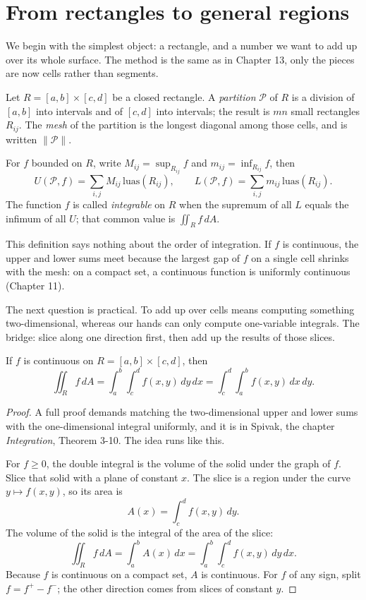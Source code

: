 \section{From rectangles to general regions}

We begin with the simplest object: a rectangle, and a
number we want to add up over its whole surface. The method is the same as in
Chapter 13, only the pieces are now cells rather than segments.

\begin{definisi}
Let $R=[a,b]\times[c,d]$ be a closed rectangle. A
\emph{partition} $\mathcal{P}$ of $R$ is a division of $[a,b]$ into
intervals and of $[c,d]$ into intervals; the result is $mn$ small
rectangles $R_{ij}$. The \emph{mesh} of the partition is the longest diagonal among
those cells, and is written $\|\mathcal{P}\|$.

For $f$ bounded on $R$, write $M_{ij}=\sup_{R_{ij}}f$ and
$m_{ij}=\inf_{R_{ij}}f$, then
\[
U(\mathcal{P},f)=\sum_{i,j}M_{ij}\,\mathrm{luas}(R_{ij}),
\qquad
L(\mathcal{P},f)=\sum_{i,j}m_{ij}\,\mathrm{luas}(R_{ij}).
\]
The function $f$ is called \emph{integrable} on $R$ when the supremum of all $L$ equals
the infimum of all $U$; that common value is $\iint_{R}f\,dA$.
\end{definisi}

This definition says nothing about the order of integration. If $f$ is continuous, the upper
and lower sums meet because the largest gap of $f$ on a single cell
shrinks with the mesh: on a compact set, a continuous function is uniformly continuous
(Chapter 11).

The next question is practical. To add up over cells means computing
something two-dimensional, whereas our hands can only compute one-variable
integrals. The bridge: slice along one direction first, then add up
the results of those slices.

\begin{teorema}[Fubini]
If $f$ is continuous on $R=[a,b]\times[c,d]$, then
\[
\iint_{R} f\,dA=\int_{a}^{b}\!\!\int_{c}^{d} f(x,y)\,dy\,dx
=\int_{c}^{d}\!\!\int_{a}^{b} f(x,y)\,dx\,dy .
\]
\end{teorema}

\begin{proof}
A full proof demands matching the two-dimensional upper and lower sums with the one-dimensional
integral uniformly, and it is in Spivak, the chapter \emph{Integration},
Theorem 3-10. The idea runs like this.

For $f\ge 0$, the double integral is the volume of the solid under the graph of $f$.
Slice that solid with a plane of constant $x$. The slice is a region under the curve
$y\mapsto f(x,y)$, so its area is
\[
A(x)=\int_{c}^{d}f(x,y)\,dy .
\]
The volume of the solid is the integral of the area of the slice:
\[
\iint_{R}f\,dA=\int_{a}^{b}A(x)\,dx=\int_{a}^{b}\!\!\int_{c}^{d}f(x,y)\,dy\,dx .
\]
Because $f$ is continuous on a compact set, $A$ is continuous. For $f$ of any
sign, split $f=f^{+}-f^{-}$; the other direction comes from slices of constant $y$.
\end{proof}

